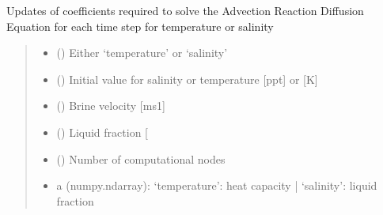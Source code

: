\documentclass[a4paper,11pt,english,openany]{sphinxmanual}
\begin{document}
\begin{fulllineitems}
\label{\detokenize{api/spyice.coefficients:spyice.coefficients.update_coefficients}}
\pysigstartsignatures
{}
\pysigstopsignatures
\sphinxAtStartPar
Updates of coefficients required to solve the Advection Reaction Diffusion Equation for each time step for temperature or salinity
\begin{quote}\begin{description}
\begin{itemize}
\item {} 
\sphinxAtStartPar
{} () \textendash{} Either ‘temperature’ or ‘salinity’

\item {} 
\sphinxAtStartPar
{} () \textendash{} Initial value for salinity or temperature {[}ppt{]} or {[}K{]}

\item {} 
\sphinxAtStartPar
{} () \textendash{} Brine velocity {[}ms\sphinxhyphen{}1{]}

\item {} 
\sphinxAtStartPar
{} () \textendash{} Liquid fraction {[}\sphinxhyphen{}{]}

\item {} 
\sphinxAtStartPar
{} () \textendash{} Number of computational nodes

\end{itemize}

\sphinxAtStartPar
\begin{description}
\begin{itemize}
\item {} 
\sphinxAtStartPar
a (numpy.ndarray): ‘temperature’: heat capacity | ‘salinity’: liquid fraction


\end{itemize}
\end{description}
\end{description}
\end{quote}
\end{fulllineitems}
\end{document}
